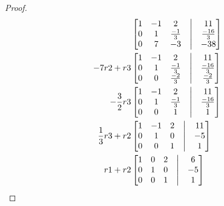 \documentclass[11pt]{article}
\begin{document}
\begin{proof}
\begin{align*}
                 &
                \begin{bmatrix}
                        1 & -1 & 2            & \bigm| & 11            \\
                        0 & 1  & \frac{-1}{3} & \bigm| & \frac{-16}{3} \\
                        0 & 7  & -3           & \bigm| & -38           \\
                \end{bmatrix} \\
                -7r2+r3
                 &
                \begin{bmatrix}
                        1 & -1 & 2            & \bigm| & 11            \\
                        0 & 1  & \frac{-1}{3} & \bigm| & \frac{-16}{3} \\
                        0 & 0  & \frac{-2}{3} & \bigm| & \frac{-2}{3}  \\
                \end{bmatrix} \\
                -\frac{3}{2}r3
                 &
                \begin{bmatrix}
                        1 & -1 & 2            & \bigm| & 11            \\
                        0 & 1  & \frac{-1}{3} & \bigm| & \frac{-16}{3} \\
                        0 & 0  & 1            & \bigm| & 1             \\
                \end{bmatrix} \\
                \frac{1}{3}r3+r2
                 &
                \begin{bmatrix}
                        1 & -1 & 2 & \bigm| & 11 \\
                        0 & 1  & 0 & \bigm| & -5 \\
                        0 & 0  & 1 & \bigm| & 1  \\
                \end{bmatrix} \\
                r1 + r2
                 &
                \begin{bmatrix}
                        1 & 0 & 2 & \bigm| & 6  \\
                        0 & 1 & 0 & \bigm| & -5 \\
                        0 & 0 & 1 & \bigm| & 1  \\
                \end{bmatrix} \\

\end{align*}
\end{proof}
\end{document}
